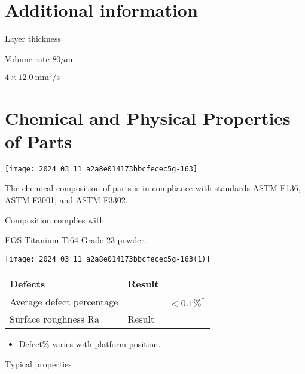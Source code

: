 \documentclass[10pt]{article}
\begin{document}
\section*{Additional information}
Layer thickness

Volume rate $80 \mu \mathrm{m}$

$4 \times 12.0 \mathrm{~mm}^{3} / \mathrm{s}$

\section*{Chemical and Physical Properties of Parts}
\begin{center}
\texttt{[image: 2024\_03\_11\_a2a8e014173bbcfecec5g-163]}
\end{center}

The chemical composition of parts is in compliance with standards ASTM F136, ASTM F3001, and ASTM F3302.

Composition complies with

EOS Titanium Ti64 Grade 23 powder.

\begin{center}
\texttt{[image: 2024\_03\_11\_a2a8e014173bbcfecec5g-163(1)]}
\end{center}

\begin{center}
\begin{tabular}{llc}
\hline
Defects & Result &  \\
\hline
Average defect percentage &  & $<0.1 \%^{*}$ \\
\hline
Surface roughness Ra & Result &  \\
\hline
\end{tabular}
\end{center}

\begin{itemize}
  \item Defect\% varies with platform position.
\end{itemize}

Typical properties
\end{document}
